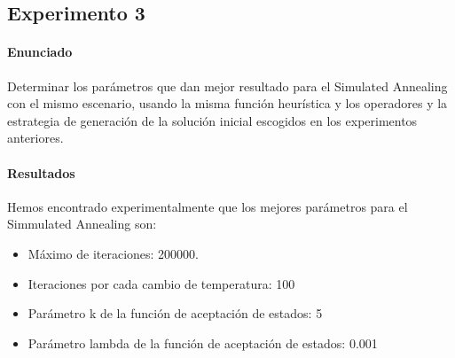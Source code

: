\subsection{Experimento 3}
\paragraph{Enunciado}
Determinar los parámetros que dan mejor resultado para el Simulated Annealing con el mismo escenario, usando la misma función heurística y los operadores y la estrategia de generación de la solución inicial escogidos en los experimentos anteriores.
\paragraph{Resultados}
Hemos encontrado experimentalmente que los mejores parámetros para el Simmulated Annealing son:
\begin{itemize}
\item Máximo de iteraciones: 200000.
\item Iteraciones por cada cambio de temperatura: 100
\item Parámetro k de la función de aceptación de estados: 5
\item Parámetro lambda de la función de aceptación de estados: 0.001

\end{itemize}
